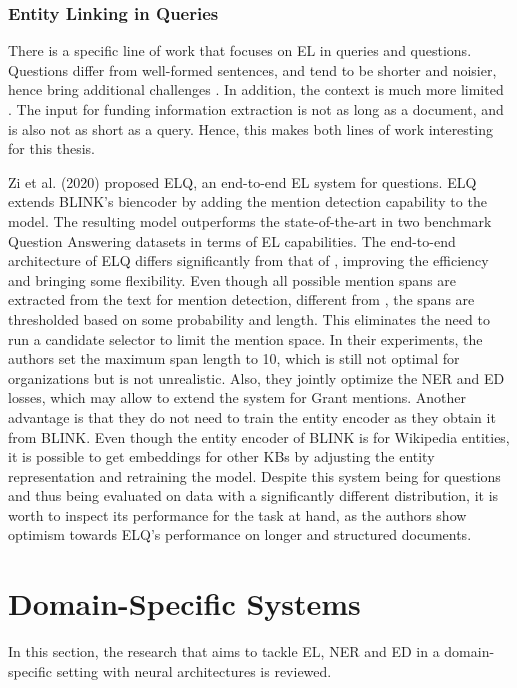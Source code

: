 \documentclass{report}
\theoremstyle{definition}
\theoremstyle{remark}
\begin{document}
\subsubsection{Entity Linking in Queries}
There is a specific line of work that focuses on EL in queries and questions. Questions differ from well-formed sentences, and tend to be shorter and noisier, hence bring additional challenges \cite{elq}. In addition, the context is much more limited \cite{ELinConv}. The input for funding information extraction is not as long as a document, and is also not as short as a query. Hence, this makes both lines of work interesting for this thesis.

Zi et al. (2020) \cite{elq} proposed ELQ, an end-to-end EL system for questions. ELQ extends BLINK's biencoder by adding the mention detection capability to the model. The resulting model outperforms the state-of-the-art in two benchmark Question Answering datasets in terms of EL capabilities. The end-to-end architecture of ELQ differs significantly from that of \cite{kolitsas}, improving the efficiency and bringing some flexibility. Even though all possible mention spans are extracted from the text for mention detection, different from \cite{kolitsas}, the spans are thresholded based on some probability and length. This eliminates the need to run a candidate selector to limit the mention space. In their experiments, the authors set the maximum span length to 10, which is still not optimal for organizations but is not unrealistic. Also, they jointly optimize the NER and ED losses, which may allow to extend the system for Grant mentions. Another advantage is that they do not need to train the entity encoder as they obtain it from BLINK. Even though the entity encoder of BLINK is for Wikipedia entities, it is possible to get embeddings for other KBs by adjusting the entity representation and retraining the model. Despite this system being for questions and thus being evaluated on data with a significantly different distribution, it is worth to inspect its performance for the task at hand, as the authors show optimism towards ELQ's performance on longer and structured documents.

\section{Domain-Specific Systems}
\label{domSpec}
In this section, the research that aims to tackle EL, NER and ED in a domain-specific setting with neural architectures is reviewed.
\end{document}
